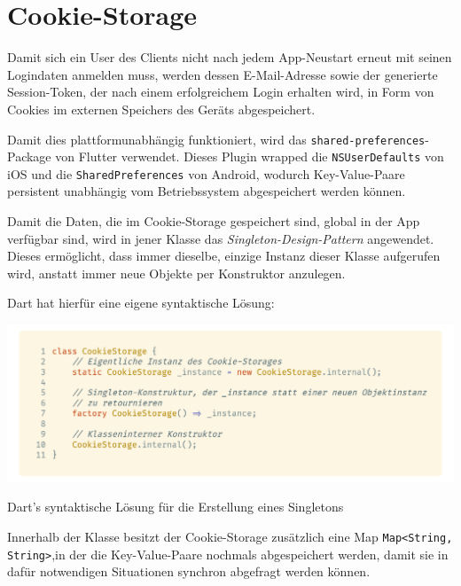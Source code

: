 \section{Cookie-Storage}
\label{clientcookie}

Damit sich ein User des Clients nicht nach jedem App-Neustart erneut mit seinen Logindaten anmelden muss,
werden dessen E-Mail-Adresse sowie der generierte Session-Token, der nach einem erfolgreichem Login erhalten wird, 
in Form von Cookies im externen Speichers des Geräts abgespeichert.


Damit dies plattformunabhängig funktioniert, wird das \lstinline{shared-preferences}-Package von Flutter
verwendet.
Dieses Plugin wrapped die \lstinline{NSUserDefaults} von iOS und die \lstinline{SharedPreferences} von Android,
wodurch Key-Value-Paare persistent unabhängig vom Betriebssystem abgespeichert werden können.

Damit die Daten, die im Cookie-Storage gespeichert sind, global in der App verfügbar sind, wird in jener Klasse das \textit{Singleton-Design-Pattern} angewendet. Dieses ermöglicht, dass immer dieselbe, einzige Instanz dieser Klasse aufgerufen wird, anstatt immer neue Objekte per Konstruktor anzulegen.

Dart hat hierfür eine eigene syntaktische Lösung:

\begin{code}[H]
    \centering
    \includegraphics[width=1\textwidth]{images/Client/util/cookie-storage/cookieStorageSingleton.png}
    \vspace{-25pt}
    \caption{Dart's syntaktische Lösung für die Erstellung eines Singletons}
\end{code}

Innerhalb der Klasse besitzt der Cookie-Storage zusätzlich eine Map \lstinline{Map<String, String>},in der die Key-Value-Paare nochmals abgespeichert werden, damit sie in dafür notwendigen Situationen synchron abgefragt werden können.

